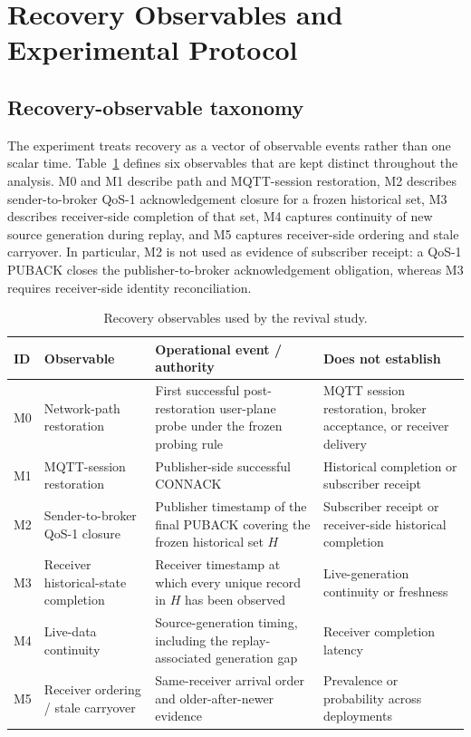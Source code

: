 \documentclass[journal]{IEEEtran}
\begin{document}
\section{Recovery Observables and Experimental Protocol}
\label{sec:protocol}

\subsection{Recovery-observable taxonomy}

The experiment treats recovery as a vector of observable events rather than one scalar time. Table~\ref{tab:observables} defines six observables that are kept distinct throughout the analysis. M0 and M1 describe path and MQTT-session restoration, M2 describes sender-to-broker QoS-1 acknowledgement closure for a frozen historical set, M3 describes receiver-side completion of that set, M4 captures continuity of new source generation during replay, and M5 captures receiver-side ordering and stale carryover. In particular, M2 is not used as evidence of subscriber receipt: a QoS-1 PUBACK closes the publisher-to-broker acknowledgement obligation, whereas M3 requires receiver-side identity reconciliation.

\begin{table}[t]
\centering
\small
\caption{Recovery observables used by the revival study.}
\label{tab:observables}
\begin{tabular}{p{}p{}p{}p{}}
\toprule
\textbf{ID} & \textbf{Observable} & \textbf{Operational event / authority} & \textbf{Does not establish} \\
\midrule
M0 & Network-path restoration & First successful post-restoration user-plane probe under the frozen probing rule & MQTT session restoration, broker acceptance, or receiver delivery \\
M1 & MQTT-session restoration & Publisher-side successful CONNACK & Historical completion or subscriber receipt \\
M2 & Sender-to-broker QoS-1 closure & Publisher timestamp of the final PUBACK covering the frozen historical set $H$ & Subscriber receipt or receiver-side historical completion \\
M3 & Receiver historical-state completion & Receiver timestamp at which every unique record in $H$ has been observed & Live-generation continuity or freshness \\
M4 & Live-data continuity & Source-generation timing, including the replay-associated generation gap & Receiver completion latency \\
M5 & Receiver ordering / stale carryover & Same-receiver arrival order and older-after-newer evidence & Prevalence or probability across deployments \\
\bottomrule
\end{tabular}
\end{table}
\end{document}
